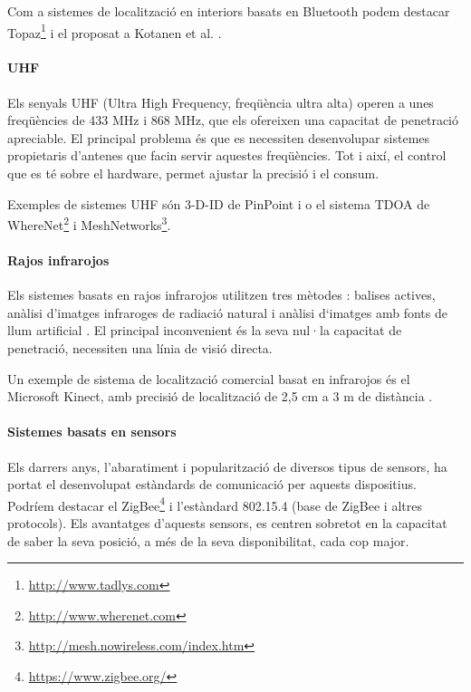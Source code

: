Com a sistemes de localització en interiors basats en Bluetooth podem destacar Topaz\footnote{\url{http://www.tadlys.com}} i el proposat a Kotanen et al. \cite{kotanen}.

\paragraph{UHF}

Els senyals UHF (Ultra High Frequency, freqüència ultra alta) operen a unes freqüències de 433 MHz i 868 MHz, que els ofereixen una capacitat de penetració apreciable. El principal problema és que es necessiten desenvolupar sistemes propietaris d'antenes que facin servir aquestes freqüències. Tot i així, el control que es té sobre el hardware, permet ajustar la precisió i el consum.

Exemples de sistemes UHF són 3-D-ID de PinPoint \cite{werb} i o el sistema TDOA de WhereNet\footnote{\url{http://www.wherenet.com}} i MeshNetworks\footnote{\url{http://mesh.nowireless.com/index.htm}}.

\paragraph{Rajos infrarojos}

Els sistemes basats en rajos infrarojos utilitzen tres mètodes \cite{chan}: balises actives, anàlisi d’imatges infraroges de radiació natural i anàlisi d‘imatges amb fonts de llum artificial \cite{mautz}. El principal inconvenient és la seva nul·la capacitat de penetració, necessiten una línia de visió directa.

Un exemple de sistema de localització comercial basat en infrarojos és el Microsoft Kinect, amb precisió de localització de 2,5 cm a 3 m de distància \cite{khoshelham}.

\paragraph{Sistemes basats en sensors}

Els darrers anys, l'abaratiment i popularització de diversos tipus de sensors, ha portat el desenvolupat estàndards de comunicació per aquests dispositius. Podríem destacar el ZigBee\footnote{\url{https://www.zigbee.org/}} i l'estàndard 802.15.4 (base de ZigBee i altres protocols). Els avantatges d'aquests sensors, es centren sobretot en la capacitat de saber la seva posició, a més de la seva disponibilitat, cada cop major.

